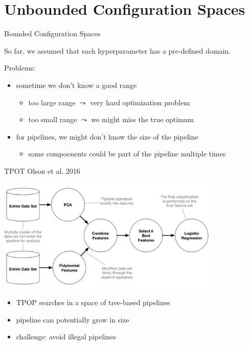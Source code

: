 \section{Unbounded Configuration Spaces}
\begin{frame}[c]{Bounded Configuration Spaces}

So far, we assumed that each hyperparameter has a pre-defined domain.

Problems:
\begin{itemize}
  \item sometime we don't know a good range
  \begin{itemize}
     \item too large range $\leadsto$ very hard optimization problem
     \item too small range $\leadsto$ we might miss the true optimum
  \end{itemize}
  \pause
  \medskip
  \item for pipelines, we might don't know the size of the pipeline
  \begin{itemize}
    \item some compoenents could be part of the pipeline multiple times
  \end{itemize}
\end{itemize}

\end{frame}
\begin{frame}[c]{TPOT {Olson et al. 2016}}

\centering
\includegraphics[width=0.8\textwidth]{images/tpot_tree}

\begin{itemize}
  \item TPOP searches in a space of tree-based pipelines
  \item pipeline can potentially grow in size
  \item challenge: avoid illegal pipelines
\end{itemize}

\end{frame}

